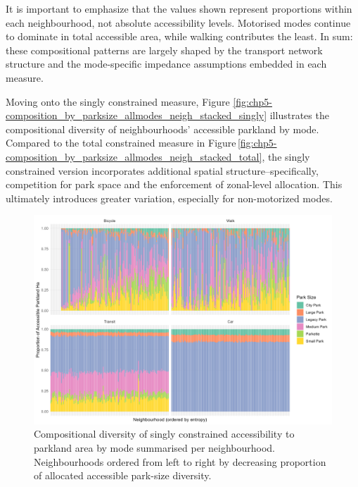 \documentclass[
11pt, %
oneside, %
english, %
singlespacing, %
]{macthesis} %
\begin{document}
It is important to emphasize that the values shown represent proportions within each neighbourhood, not absolute accessibility levels. Motorised modes continue to dominate in total accessible area, while walking contributes the least. In sum: these compositional patterns are largely shaped by the transport network structure and the mode-specific impedance assumptions embedded in each measure.

Moving onto the singly constrained measure, Figure \ref{fig:chp5-composition_by_parksize_allmodes_neigh_stacked_singly} illustrates the compositional diversity of neighbourhoods' accessible parkland by mode. Compared to the total constrained measure in Figure\,\ref{fig:chp5-composition_by_parksize_allmodes_neigh_stacked_total}, the singly constrained version incorporates additional spatial structure--specifically, competition for park space and the enforcement of zonal-level allocation. This ultimately introduces greater variation, especially for non-motorized modes.

\begin{figure}

{\centering \includegraphics[width=6in]{./data/figures/chp5-composition_by_parksize_allmodes_neigh_stacked_singly} 

}

\caption{\label{fig:chp5-composition_by_parksize_allmodes_neigh_stacked_singly} Compositional diversity of singly constrained accessibility to parkland area by mode summarised per neighbourhood. Neighbourhoods ordered from left to right by decreasing proportion of allocated accessible park-size diversity.}\label{fig:unnamed-chunk-87}
\end{figure}
\end{document}
